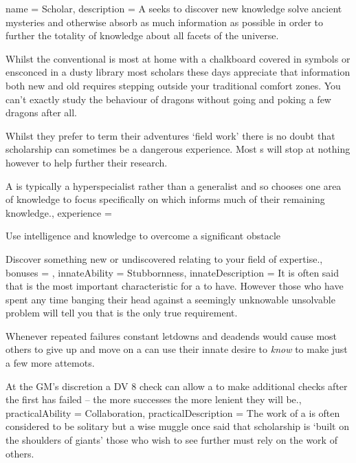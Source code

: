 \archetype
{
	name = Scholar,
	description = A \bname{} seeks to discover new knowledge\comma{} solve ancient mysteries and otherwise absorb as much information as possible\comma{} in order to further the totality of knowledge about all facets of the universe. 

Whilst the conventional \bname{} is most at home with a chalkboard covered in symbols\comma{} or ensconced in a dusty library\comma{} most scholars these days appreciate that information\comma{} both new and old\comma{} requires stepping outside your traditional comfort zones. You can’t exactly study the behaviour of dragons without going and poking a few dragons\comma{} after all. 

Whilst they prefer to term their adventures `field work’\comma{} there is no doubt that scholarship can sometimes be a dangerous experience. Most \bname{}s will stop at nothing\comma{} however\comma{} to help further their research. 

A \bname{} is typically a hyper\minus{}specialist\comma{} rather than a generalist\comma{} and so chooses one area of knowledge to focus specifically on\comma{} which informs much of their remaining knowledge.,
	experience = \item Use intelligence and knowledge to overcome a significant obstacle
\item Discover something new or undiscovered relating to your field of expertise.,
	bonuses = 
,
	innateAbility = Stubbornness,
	innateDescription = It is often said that  is the most important characteristic for a  to have. However\comma{} those who have spent any time banging their head against a seemingly unknowable\comma{} unsolvable problem will tell you that  is the only true requirement. 

Whenever repeated failures\comma{} constant letdowns and deadends would cause most others to give up and move on\comma{} a \bname{} can use their innate desire to {\it know} to make just a few more attemots. 

At the GM’s discretion\comma{} a DV 8  check can allow a \bname{} to make additional checks after the first has failed – the more successes\comma{} the more lenient they will be.,
	practicalAbility = Collaboration,
	practicalDescription = The work of a \bname{} is often considered to be solitary\comma{} but a wise muggle once said that scholarship is `built on the shoulders of giants’ \minus{} those who wish to see further must rely on the work of others. 

}
